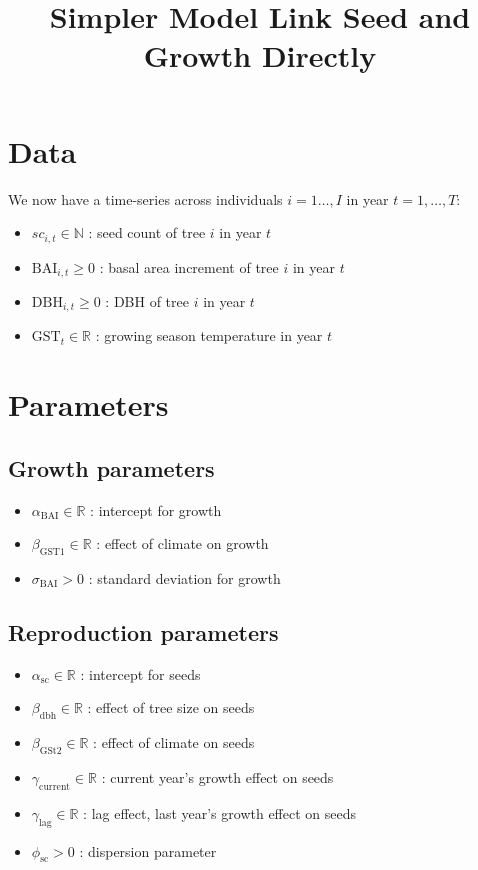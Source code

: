 \documentclass[11pt]{article}
\begin{document}
\title{Simpler Model Link Seed and Growth Directly}
\author{}
\date{}
\maketitle

\section*{Data}

We now have a time-series across individuals $i = 1 \dots, I$ in year $t = 1, \dots, T$:

\begin{itemize}
    \item $sc_{i,t} \in \mathbb{N}$ : seed count of tree $i$ in year $t$
    \item $\text{BAI}_{i,t} \ge 0$ : basal area increment of tree $i$ in year $t$
    \item $\text{DBH}_{i,t} \ge 0$ : DBH of tree $i$ in year $t$
    \item $\text{GST}_{t} \in \mathbb{R}$ : growing season temperature in year $t$
\end{itemize}


\section*{Parameters}

\subsection*{Growth parameters}
\begin{itemize}
    \item $\alpha_{\text{BAI}} \in \mathbb{R}$ : intercept for growth
    \item $\beta_{\text{GST1}} \in \mathbb{R}$ : effect of climate on growth
    \item $\sigma_{\text{BAI}} > 0$ : standard deviation for growth
\end{itemize}

\subsection*{Reproduction parameters}
\begin{itemize}
    \item $\alpha_{\text{sc}} \in \mathbb{R}$ : intercept for seeds
    \item $\beta_{\text{dbh}} \in \mathbb{R}$ : effect of tree size on seeds
    \item $\beta_{\text{GSt2}} \in \mathbb{R}$ : effect of climate on seeds
    \item $\gamma_{\text{current}} \in \mathbb{R}$ : current year's growth effect on seeds
    \item $\gamma_{\text{lag}} \in \mathbb{R}$ : lag effect, last year's growth effect on seeds
    \item $\phi_{\text{sc}} > 0$ : dispersion parameter
\end{itemize}
\end{document}
